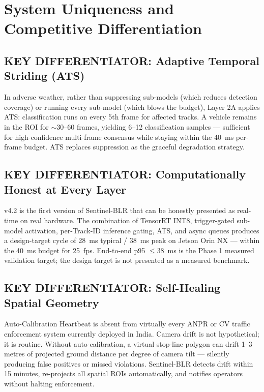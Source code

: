 \documentclass[11pt,a4paper]{article}
\begin{document}
\section{System Uniqueness and Competitive Differentiation}

\subsection*{KEY DIFFERENTIATOR: Adaptive Temporal Striding (ATS)}

In adverse weather, rather than suppressing sub-models (which reduces detection coverage) or running every sub-model (which blows the budget), Layer 2A applies ATS: classification runs on every 5th frame for affected tracks. A vehicle remains in the ROI for $\sim$30--60 frames, yielding 6--12 classification samples — sufficient for high-confidence multi-frame consensus while staying within the 40~ms per-frame budget. ATS replaces suppression as the graceful degradation strategy.

\subsection*{KEY DIFFERENTIATOR: Computationally Honest at Every Layer}

v4.2 is the first version of Sentinel-BLR that can be honestly presented as real-time on real hardware. The combination of TensorRT INT8, trigger-gated sub-model activation, per-Track-ID inference gating, ATS, and async queues produces a design-target cycle of 28~ms typical / 38~ms peak on Jetson Orin NX — within the 40~ms budget for 25~fps. End-to-end p95 $\leq 38$~ms is the Phase 1 measured validation target; the design target is not presented as a measured benchmark.

\subsection*{KEY DIFFERENTIATOR: Self-Healing Spatial Geometry}

Auto-Calibration Heartbeat is absent from virtually every ANPR or CV traffic enforcement system currently deployed in India. Camera drift is not hypothetical; it is routine. Without auto-calibration, a virtual stop-line polygon can drift 1--3 metres of projected ground distance per degree of camera tilt — silently producing false positives or missed violations. Sentinel-BLR detects drift within 15 minutes, re-projects all spatial ROIs automatically, and notifies operators without halting enforcement.
\end{document}
